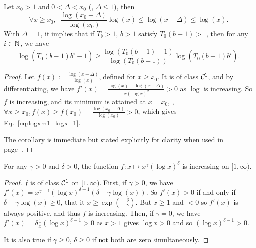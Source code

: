 \documentclass[12pt]{colt2018} %
\begin{document}
\begin{lemma}\label{lem:logxm1_logx}
    Let $x_0 > 1$ and $0 < \Delta < x_0$ (\eg, $\Delta \leq 1$), then
    \begin{equation}\label{eq:logxm1_logx_1}
        \forall x \geq x_0,\;\;
        \frac{\log(x_0-\Delta)}{\log(x_0)} \log(x)
        \leq \log(x-\Delta)
        \leq \log(x).
    \end{equation}
    With $\Delta=1$, it implies that if $T_0>1$, $b>1$ satisfy $T_0(b-1)>1$,
    then for any $i\in\mathbb{N}$, we have
    \begin{equation}\label{eq:logxm1_logx_2}
        \log(T_0(b-1)b^i-1) \geq \frac{\log(T_0(b-1)-1)}{\log(T_0(b-1))} \log(T_0(b-1)b^i).
    \end{equation}
\end{lemma}
\begin{proof}\label{proof:logxm1_logx}
    Let $f(x) := \frac{\log(x-\Delta)}{\log(x)}$, defined for $x\geq x_0$.
    It is of class $\mathcal{C}^1$, and by differentiating, we have $f'(x) = \frac{\log(x) - \log(x-\Delta)}{x (\log x)^2} > 0$ as $\log$ is increasing.
    So $f$ is increasing, and its minimum is attained at $x = x_0$,
    \ie, $\forall x\geq x_0, f(x) \geq f(x_0) = \frac{\log(x_0 - \Delta)}{\log(x_0)} > 0$, which gives Eq.~\eqref{eq:logxm1_logx_1}.

    The corollary is immediate but stated explicitly for clarity when used in page~\pageref{proof:LowerBoundGeom_log}.
\end{proof}

\vspace*{5pt}

\begin{lemma}\label{lem:tgammalogtdeltaIncreasing}
    For any $\gamma > 0$ and $\delta>0$,
    the function $f: x \mapsto x^{\gamma}(\log x)^{\delta}$ is increasing on $[1, \infty)$.
\end{lemma}
\begin{proof}\label{proof:tgammalogtdeltaIncreasing}
    $f$ is of class $\mathcal{C}^1$ on $[1, \infty)$.
    First, if $\gamma > 0$,
    we have $f'(x) = x^{\gamma-1}(\log x)^{\delta-1} \left( \delta + \gamma \log(x)\right)$.
    So $f'(x) > 0$ if and only if $\delta + \gamma \log(x) \geq 0$, that it $x \geq \exp(- \frac{\delta}{\gamma})$.
    But $x \geq 1$ and $ < 0$ so $f'(x)$ is always positive, and thus $f$ is increasing.
    Then, if $\gamma = 0$,
    we have $f'(x) = \delta \frac{1}{x}(\log x)^{\delta-1} > 0$ as $x > 1$ gives $\log x > 0$
    and so $(\log x)^{\delta-1} > 0$.

    It is also true if $\gamma \geq 0$, $\delta \geq 0$ if not both are zero simultaneously.
\end{proof}
\end{document}
